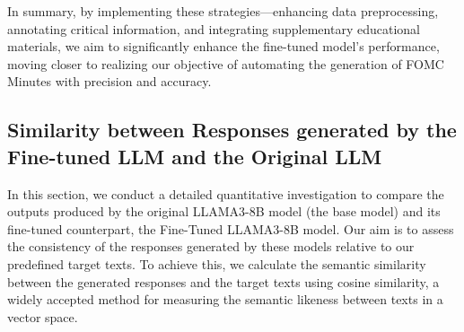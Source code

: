 In summary, by implementing these strategies—enhancing data preprocessing, annotating critical information, and integrating supplementary educational materials, we aim to significantly enhance the fine-tuned model's performance, moving closer to realizing our objective of automating the generation of FOMC Minutes with precision and accuracy.












\subsection{Similarity between Responses generated by the Fine-tuned LLM and the Original LLM}

In this section, we conduct a detailed quantitative investigation to compare the outputs produced by the original LLAMA3-8B model (the base model) and its fine-tuned counterpart, the Fine-Tuned LLAMA3-8B model. Our aim is to assess the consistency of the responses generated by these models relative to our predefined target texts. To achieve this, we calculate the semantic similarity between the generated responses and the target texts using cosine similarity, a widely accepted method for measuring the semantic likeness between texts in a vector space.


